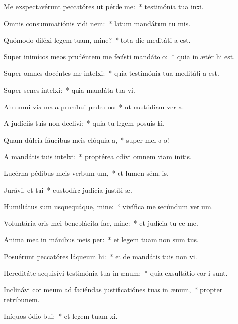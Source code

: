 \item Me exspectavérunt peccatóres ut pérde me:~* testimónia tua inxi.
\item Omnis consummatiónis vidi nem:~* latum mandátum tu mis.
\item Quómodo diléxi legem tuam, mine?~* tota die meditáti a est.
\item Super inimícos meos prudéntem me fecísti mandáto o:~* quia in ætér hi est.
\item Super omnes docéntes me intelxi:~* quia testimónia tua meditáti a est.
\item Super senes intelxi:~* quia mandáta tua vi.
\item Ab omni via mala prohíbui pedes os:~* ut custódiam ver a.
\item A judíciis tuis non declivi:~* quia tu legem posuís hi.
\item Quam dúlcia fáucibus meis elóquia a,~* super mel o o!
\item A mandátis tuis intelxi:~* proptérea odívi omnem viam initis.
\item Lucérna pédibus meis verbum um,~* et lumen sémi is.
\item Jurávi, et tui~* custodíre judícia justíti æ.
\item Humiliátus sum usquequáque, mine:~* vivífica me secúndum ver um.
\item Voluntária oris mei beneplácita fac, mine:~* et judícia tu ce me.
\item Anima mea in mánibus meis per:~* et legem tuam non sum tus.
\item Posuérunt peccatóres láqueum hi:~* et de mandátis tuis non vi.
\item Hereditáte acquisívi testimónia tua in ænum:~* quia exsultátio cor i sunt.
\item Inclinávi cor meum ad faciéndas justificatiónes tuas in ænum,~* propter retribunem.
\item Iníquos ódio bui:~* et legem tuam xi.
